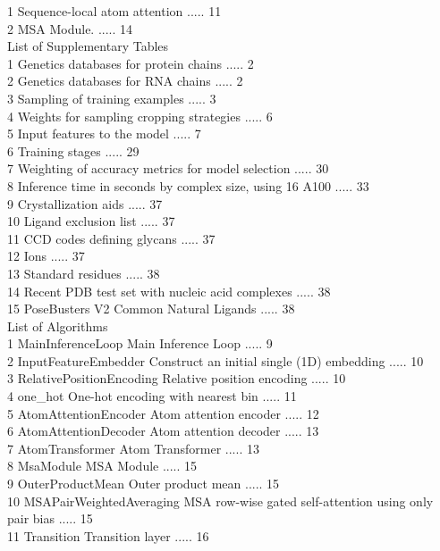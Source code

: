 \documentclass[10pt]{article}
\begin{document}
1 Sequence-local atom attention ..... 11\\
2 MSA Module. ..... 14\\
List of Supplementary Tables\\
1 Genetics databases for protein chains ..... 2\\
2 Genetics databases for RNA chains ..... 2\\
3 Sampling of training examples ..... 3\\
4 Weights for sampling cropping strategies ..... 6\\
5 Input features to the model ..... 7\\
6 Training stages ..... 29\\
7 Weighting of accuracy metrics for model selection ..... 30\\
8 Inference time in seconds by complex size, using 16 A100 ..... 33\\
9 Crystallization aids ..... 37\\
10 Ligand exclusion list ..... 37\\
11 CCD codes defining glycans ..... 37\\
12 Ions ..... 37\\
13 Standard residues ..... 38\\
14 Recent PDB test set with nucleic acid complexes ..... 38\\
15 PoseBusters V2 Common Natural Ligands ..... 38\\
List of Algorithms\\
1 MainInferenceLoop Main Inference Loop ..... 9\\
2 InputFeatureEmbedder Construct an initial single (1D) embedding ..... 10\\
3 RelativePositionEncoding Relative position encoding ..... 10\\
4 one\_hot One-hot encoding with nearest bin ..... 11\\
5 AtomAttentionEncoder Atom attention encoder ..... 12\\
6 AtomAttentionDecoder Atom attention decoder ..... 13\\
7 AtomTransformer Atom Transformer ..... 13\\
8 MsaModule MSA Module ..... 15\\
9 OuterProductMean Outer product mean ..... 15\\
10 MSAPairWeightedAveraging MSA row-wise gated self-attention using only pair bias ..... 15\\
11 Transition Transition layer ..... 16\\
\end{document}
